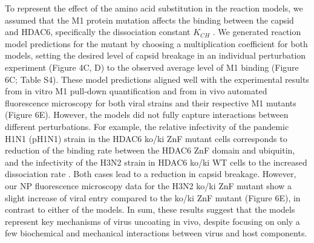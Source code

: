 To represent the effect of the amino acid substitution in the reaction models, we assumed that the M1 protein mutation affects the binding between the capsid and HDAC6, specifically the dissociation constant $K_{CH}$ . We generated reaction model predictions for the mutant by choosing a multiplication coefficient for both models, setting the desired level of capsid breakage in an individual perturbation experiment (Figure 4C, D) to the observed average level of M1 binding (Figure 6C; Table S4). These model predictions aligned well with the experimental results from in vitro M1 pull-down quantification and from in vivo automated fluorescence microscopy for both viral strains and their respective M1 mutants (Figure 6E). However, the models did not fully capture interactions between different perturbations. For example, the relative infectivity of the pandemic H1N1 (pH1N1) strain in the HDAC6 ko/ki ZnF mutant cells corresponds to reduction of the binding rate  between the HDAC6 ZnF domain and ubiquitin, and the infectivity of the H3N2 strain in HDAC6 ko/ki WT cells to the increased dissociation rate  . Both cases lead to a reduction in capsid breakage. However, our NP fluorescence microscopy data for the H3N2 ko/ki ZnF mutant show a slight increase of viral entry compared to the ko/ki ZnF mutant (Figure 6E), in contrast to either of the models. In sum, these results suggest that the models represent key mechanisms of virus uncoating in vivo, despite focusing on only a few biochemical and mechanical interactions between virus and host components.

